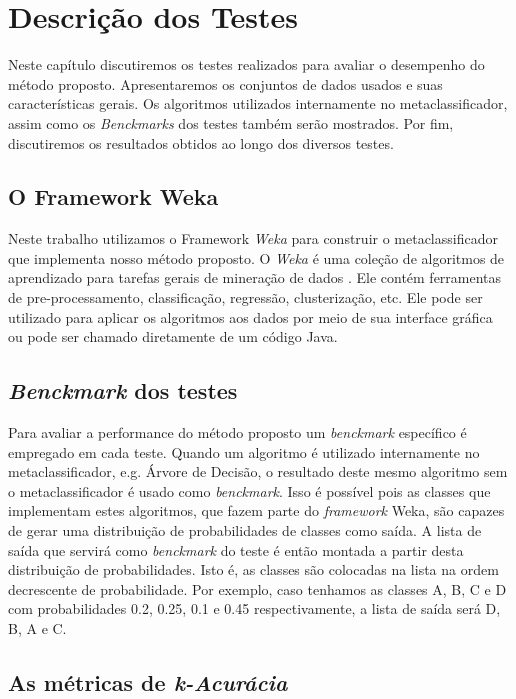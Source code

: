 \chapter{Descrição dos Testes}
\label{chap:descricaodostestes}

Neste capítulo discutiremos os testes realizados para avaliar o desempenho do método proposto.
Apresentaremos os conjuntos de dados usados e suas características gerais. 
Os algoritmos utilizados internamente no metaclassificador, assim como os \textit{Benckmarks} dos testes também serão mostrados.
Por fim, discutiremos os resultados obtidos ao longo dos diversos testes.

\section{O Framework Weka}

Neste trabalho utilizamos o Framework \textit{Weka} para construir o metaclassificador que implementa nosso método proposto. 
O \textit{Weka} é uma coleção de algoritmos de aprendizado para tarefas gerais de mineração de dados \cite{Hall}.
Ele contém ferramentas de pre-processamento, classificação, regressão, clusterização, etc.
Ele pode ser utilizado para aplicar os algoritmos aos dados por meio de sua interface gráfica ou pode ser chamado diretamente de um código Java.

\section{\textit{Benckmark} dos testes}

Para avaliar a performance do método proposto um \textit{benckmark} específico é empregado em cada teste.
Quando um algoritmo é utilizado internamente no metaclassificador, e.g. Árvore de Decisão, o resultado deste mesmo algoritmo sem o metaclassificador é usado como \textit{benckmark}.
Isso é possível pois as classes que implementam estes algoritmos, que fazem parte do \textit{framework} Weka, são capazes de gerar uma distribuição de probabilidades de classes como saída.
A lista de saída que servirá como \textit{benckmark} do teste é então montada a partir desta distribuição de probabilidades.
Isto é, as classes são colocadas na lista na ordem decrescente de probabilidade.
Por exemplo, caso tenhamos as classes A, B, C e D com probabilidades 0.2, 0.25, 0.1 e 0.45 respectivamente, a lista de saída será D, B, A e C.

\section{As métricas de \textit{k-Acurácia}}

